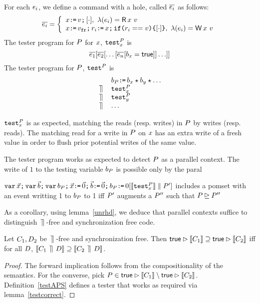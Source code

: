 \begin{definition}\label{testAPS}
For each $e_i$, we define a command with a hole, called $\overline{e_i}$ as follows:
\[
\test{\aEv_i} = \left\{ 
                             \begin{array}{l}
                              \aLoc\GETS\aVal \SEMI \hole{\cdot}, \ \labeling(\aEv_i) = \DR{\aLoc}{\aVal} \\
                              \aLoc\GETS\freshaval\SEMI \aReg_i \GETS\aLoc \SEMI \IF{\aReg_i == \aVal} \THEN \hole{\cdot} \FI , \ \labeling(\aEv_i) = \DW{\aLoc}{\aVal} \\
                           \end{array}
                       \right.
\]    
The tester program for $P$ for $x$, ${\tt test}^{P}_{x}$ is \[ \overline{e_1}[\overline{e_2}[\ldots [\overline{e_n}[b_{x} = \mathsf{true}]]\ldots]] \]
The tester program for $P$, ${\tt test}^{P}_{}$ is 
\[
\begin{array}{ll}
& b_{P}\texttt{:}\mkern-1mu\texttt{=}\, b_{x} \star b_{y} \star  \ldots   \\
\,\mathbin{\rrceil}\, & {\tt test}^{P}_{x} \\
\,\mathbin{\rrceil}\, & {\tt test}^{P}_{y} \\
 \,\mathbin{\rrceil}\,  & \ldots 
\end{array}
\]
\end{definition}
 ${\tt test}^{P}_{x}$ is as expected, matching the reads (resp. writes) in $P$ by writes (resp. reads).  The matching read for a write in $P$ on $x$ has an extra write of a fresh value in order to flush prior potential writes of the same value.    

The tester program works as expected to detect $P$ as a parallel context.  
The write of $1$ to the testing variable $b_{P}$ is possible only by the paral
\begin{lemma}\label{testcorrect}
$\texttt{var}\,\vec{x}\texttt{;}\, \texttt{var}\,\vec{b} \texttt{;}\, \texttt{var}\, b_{P} \texttt{;}\,
    \vec{x}\texttt{:}\mkern-1mu\texttt{=}\,\vec{0}\texttt{;}\,
    \vec{b}\texttt{:}\mkern-1mu\texttt{=}\,\vec{0} \texttt{;}\, b_{P}\texttt{:}\mkern-1mu\texttt{=}\, 0 [\llbracket{\tt test}^{P}_{x}\rrbracket \parallel P']$
includes a pomset with an event writting 1 to $b_{P}$ to 1 iff $P'$ augments a $P''$ such that $P \unrhd P''$
\end{lemma}
As a corollary, using lemma~\ref{unrhd}, we deduce that parallel contexts suffice to distinguish  $\,\mathbin{\rrceil}\,$-free and synchronization free code.
\begin{theorem}
Let $C_1, D_2$ be $\,\mathbin{\rrceil}\,$-free and synchronization free.  Then $\mathsf{true}\mathbin\rhd \llbracket C_1\rrbracket  \supseteq \mathsf{true}\mathbin\rhd \llbracket C_2\rrbracket$ iff for all $D$,  $\llbracket C_1\,\mathbin{\rrceil}\, D\rrbracket  \supseteq \llbracket C_2 \,\mathbin{\rrceil}\, D\rrbracket$.
\end{theorem}
\begin{proof}
The forward implication follows from the compositionality of the semantics. For the converse, pick $P \in \mathsf{true}\mathbin\rhd \llbracket C_1\rrbracket \setminus \mathsf{true}\mathbin\rhd \llbracket C_2\rrbracket $.  Definition~\ref{testAPS} defines a tester that works as required via lemma~\ref{testcorrect}.
\end{proof}

\endinput 



